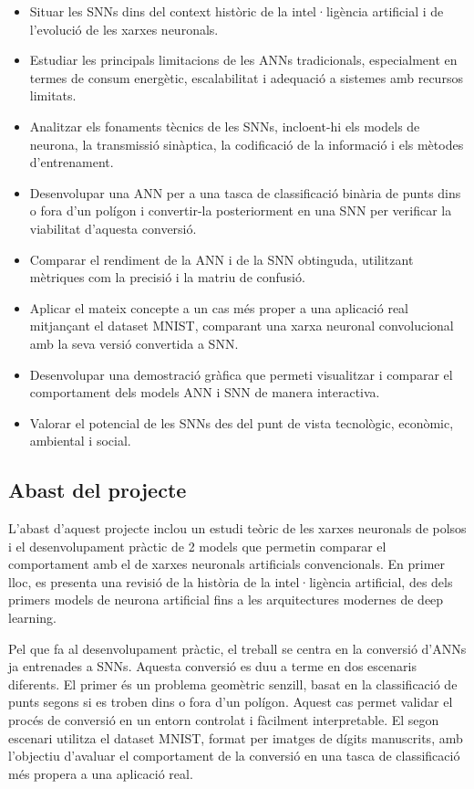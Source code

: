 \documentclass[a4paper,11pt, titlepage, twoside]{article}
\begin{document}
\begin{itemize}
	\item Situar les SNNs dins del context històric de la intel·ligència artificial i de l’evolució de les xarxes neuronals.
	\item Estudiar les principals limitacions de les ANNs tradicionals, especialment en termes de consum energètic, escalabilitat i adequació a sistemes amb recursos limitats.
	\item Analitzar els fonaments tècnics de les SNNs, incloent-hi els models de neurona, la transmissió sinàptica, la codificació de la informació i els mètodes d’entrenament.
	\item Desenvolupar una ANN per a una tasca de classificació binària de punts dins o fora d’un polígon i convertir-la posteriorment en una SNN per verificar la viabilitat d'aquesta conversió.
	\item Comparar el rendiment de la ANN i de la SNN obtinguda, utilitzant mètriques com la precisió i la matriu de confusió.
	\item Aplicar el mateix concepte a un cas més proper a una aplicació real mitjançant el dataset MNIST, comparant una xarxa neuronal convolucional amb la seva versió convertida a SNN.
	\item Desenvolupar una demostració gràfica que permeti visualitzar i comparar el comportament dels models ANN i SNN de manera interactiva.
	\item Valorar el potencial de les SNNs des del punt de vista tecnològic, econòmic, ambiental i social.
\end{itemize}
\subsection{Abast del projecte}
L’abast d’aquest projecte inclou un estudi teòric de les xarxes neuronals de polsos i el desenvolupament pràctic de 2 models que permetin comparar el comportament amb el de xarxes neuronals artificials convencionals. En primer lloc, es presenta una revisió de la història de la intel·ligència artificial, des dels primers models de neurona artificial fins a les arquitectures modernes de deep learning.

Pel que fa al desenvolupament pràctic, el treball se centra en la conversió d’ANNs ja entrenades a SNNs. Aquesta conversió es duu a terme en dos escenaris diferents. El primer és un problema geomètric senzill, basat en la classificació de punts segons si es troben dins o fora d’un polígon. Aquest cas permet validar el procés de conversió en un entorn controlat i fàcilment interpretable. El segon escenari utilitza el dataset MNIST, format per imatges de dígits manuscrits, amb l’objectiu d’avaluar el comportament de la conversió en una tasca de classificació més propera a una aplicació real.
\end{document}
